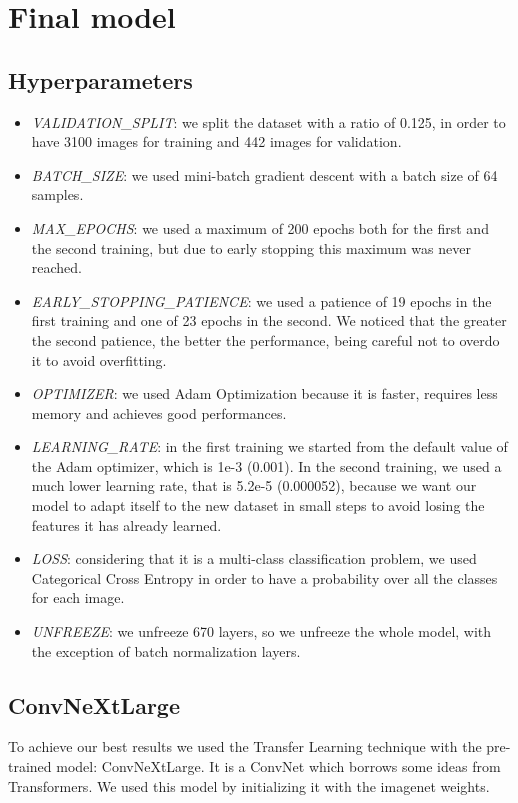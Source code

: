 \section{Final model}
\subsection{Hyperparameters}
\begin{itemize}
    \item {\textit{VALIDATION\_SPLIT}: we split the dataset with a ratio of 0.125, in order to have 3100 images for training and 442 images for validation.}
    \item {\textit{BATCH\_SIZE}: we used mini-batch gradient descent with a batch size of 64 samples.}
    \item {\textit{MAX\_EPOCHS}: we used a maximum of 200 epochs both for the first and the second training, but due to early stopping this maximum was never reached.}
    \item {\textit{EARLY\_STOPPING\_PATIENCE}: we used a patience of 19 epochs in the first training and one of 23 epochs in the second. We noticed that the greater the second patience, the better the performance, being careful not to overdo it to avoid overfitting.}
    \item {\textit{OPTIMIZER}: we used Adam Optimization because it is faster, requires less memory and achieves good performances.}
    \item {\textit{LEARNING\_RATE}: in the first training we started from the default value of the Adam optimizer, which is 1e-3 (0.001). In the second training, we used a much lower learning rate, that is 5.2e-5 (0.000052), because we want our model to adapt itself to the new dataset in small steps to avoid losing the features it has already learned.}
    \item {\textit{LOSS}: considering that it is a multi-class classification problem, we used Categorical Cross Entropy in order to have a probability over all the classes for each image.}
    \item {\textit{UNFREEZE}: we unfreeze 670 layers, so we unfreeze the whole model, with the exception of batch normalization layers.}
\end{itemize}

\subsection{ConvNeXtLarge}
To achieve our best results we used the Transfer Learning technique with the pre-trained model: ConvNeXtLarge. It is a ConvNet which borrows some ideas from Transformers. \cite{convnext}
We used this model by initializing it with the imagenet weights.

